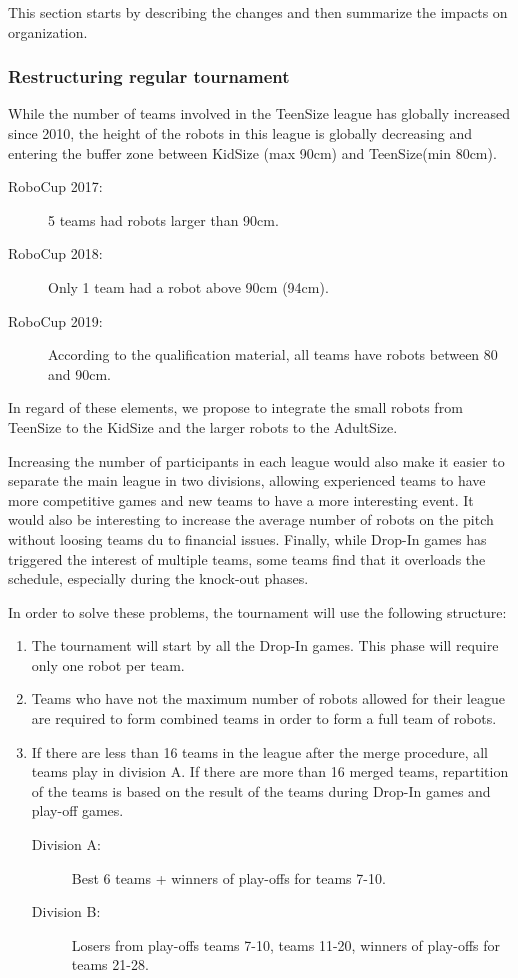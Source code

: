 \documentclass{article}
\begin{document}
This section starts by describing the changes and then summarize the impacts on
organization.


\subsubsection{Restructuring regular tournament}

While the number of teams involved in the TeenSize league has globally increased
since 2010, the height of the robots in this league is globally decreasing and
entering the buffer zone between KidSize (max 90cm) and TeenSize(min 80cm).
\begin{description}
\item[RoboCup 2017:] 5 teams had robots larger than 90cm.
\item[RoboCup 2018:] Only 1 team had a robot above 90cm (94cm).
\item[RoboCup 2019:] According to the qualification material, all teams have
  robots between 80 and 90cm.
\end{description}

In regard of these elements, we propose to integrate the small robots from
TeenSize to the KidSize and the larger robots to the AdultSize.

Increasing the number of participants in each league would also make it easier
to separate the main league in two divisions, allowing experienced teams to have
more competitive games and new teams to have a more interesting event.
It would also be interesting to increase the average number of robots on
the pitch without loosing teams du to financial issues.
Finally, while Drop-In games has triggered the interest of multiple teams,
some teams find that it overloads the schedule, especially during the knock-out
phases.

In order to solve these problems, the tournament will use the following
structure:
\begin{enumerate}
\item The tournament will start by all the Drop-In games. This phase will
  require only one robot per team.
\item Teams who have not the maximum number of robots allowed for their league
  are required to form combined teams in order to form a full team of robots.
\item If there are less than 16 teams in the league after the merge procedure,
  all teams play in division A.
  If there are more than 16 merged teams, repartition of the teams is based
  on the result of the teams during Drop-In games and play-off games.
  \begin{description}
  \item[Division A:] Best 6 teams + winners of play-offs for teams 7-10.
  \item[Division B:] Losers from play-offs teams 7-10, teams 11-20,
    winners of play-offs for teams 21-28.
  \end{description}
\end{enumerate}
\end{document}
